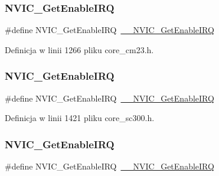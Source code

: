 \subsubsection{\texorpdfstring{N\+V\+I\+C\+\_\+\+Get\+Enable\+I\+RQ}{NVIC\_GetEnableIRQ}\hspace{0.1cm}{\footnotesize\ttfamily [6/12]}}
{\footnotesize\ttfamily \#define N\+V\+I\+C\+\_\+\+Get\+Enable\+I\+RQ~\hyperlink{group___c_m_s_i_s___core___n_v_i_c_functions_gaaeb5e7cc0eaad4e2817272e7bf742083}{\+\_\+\+\_\+\+N\+V\+I\+C\+\_\+\+Get\+Enable\+I\+RQ}}



Definicja w linii 1266 pliku core\+\_\+cm23.\+h.

\mbox{\label{group___c_m_s_i_s___core___n_v_i_c_functions_ga857de13232ec65dd15087eaa15bc4a69}} 
\subsubsection{\texorpdfstring{N\+V\+I\+C\+\_\+\+Get\+Enable\+I\+RQ}{NVIC\_GetEnableIRQ}\hspace{0.1cm}{\footnotesize\ttfamily [7/12]}}
{\footnotesize\ttfamily \#define N\+V\+I\+C\+\_\+\+Get\+Enable\+I\+RQ~\hyperlink{group___c_m_s_i_s___core___n_v_i_c_functions_gaaeb5e7cc0eaad4e2817272e7bf742083}{\+\_\+\+\_\+\+N\+V\+I\+C\+\_\+\+Get\+Enable\+I\+RQ}}



Definicja w linii 1421 pliku core\+\_\+sc300.\+h.

\mbox{\label{group___c_m_s_i_s___core___n_v_i_c_functions_ga857de13232ec65dd15087eaa15bc4a69}} 
\subsubsection{\texorpdfstring{N\+V\+I\+C\+\_\+\+Get\+Enable\+I\+RQ}{NVIC\_GetEnableIRQ}\hspace{0.1cm}{\footnotesize\ttfamily [8/12]}}
{\footnotesize\ttfamily \#define N\+V\+I\+C\+\_\+\+Get\+Enable\+I\+RQ~\hyperlink{group___c_m_s_i_s___core___n_v_i_c_functions_gaaeb5e7cc0eaad4e2817272e7bf742083}{\+\_\+\+\_\+\+N\+V\+I\+C\+\_\+\+Get\+Enable\+I\+RQ}}



